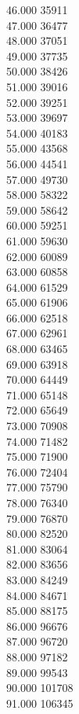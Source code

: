 { 46.000	35911 \\
 47.000	36477 \\
 48.000	37051 \\
 49.000	37735 \\
 50.000	38426 \\
 51.000	39016 \\
 52.000	39251 \\
 53.000	39697 \\
 54.000	40183 \\
 55.000	43568 \\
 56.000	44541 \\
 57.000	49730 \\
 58.000	58322 \\
 59.000	58642 \\
 60.000	59251 \\
 61.000	59630 \\
 62.000	60089 \\
 63.000	60858 \\
 64.000	61529 \\
 65.000	61906 \\
 66.000	62518 \\
 67.000	62961 \\
 68.000	63465 \\
 69.000	63918 \\
 70.000	64449 \\
 71.000	65148 \\
 72.000	65649 \\
 73.000	70908 \\
 74.000	71482 \\
 75.000	71900 \\
 76.000	72404 \\
 77.000	75790 \\
 78.000	76340 \\
 79.000	76870 \\
 80.000	82520 \\
 81.000	83064 \\
 82.000	83656 \\
 83.000	84249 \\
 84.000	84671 \\
 85.000	88175 \\
 86.000	96676 \\
 87.000	96720 \\
 88.000	97182 \\
 89.000	99543 \\
 90.000	101708 \\
 91.000	106345 \\
}
